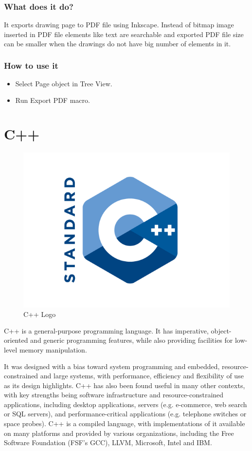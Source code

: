\subsubsection{What does it do?}
It exports drawing page to PDF file using Inkscape. Instead of bitmap 
image inserted in PDF file elements like text are searchable and exported 
PDF file size can be smaller when the drawings do not have big number of 
elements in it.
\subsubsection{How to use it}
\begin{itemize}
\item Select Page object in Tree View.
\item Run Export PDF macro.
\end{itemize}

\section{C++}

\begin{figure}[h]
    \centering \includegraphics[scale=0.3]{images/c++.png}
    \caption{C++ Logo}
\end{figure}

C++ is a general-purpose programming language. It has imperative, object-oriented and generic programming features, while also providing facilities for low-level memory manipulation.

It was designed with a bias toward system programming and embedded, resource-constrained and large systems, with performance, efficiency and flexibility of use as its design highlights. C++ has also been found useful in many other contexts, with key strengths being software infrastructure and resource-constrained applications, including desktop applications, servers (e.g. e-commerce, web search or SQL servers), and performance-critical applications (e.g. telephone switches or space probes). C++ is a compiled language, with implementations of it available on many platforms and provided by various organizations, including the Free Software Foundation (FSF's GCC), LLVM, Microsoft, Intel and IBM.

